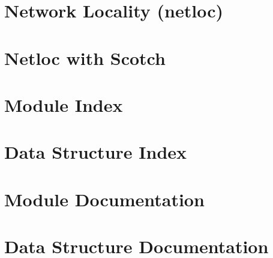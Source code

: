 \documentclass[twoside]{book}
\newcommand{\+}{\discretionary{\mbox{\scriptsize$\hookleftarrow$}}{}{}}
\newcommand{\clearemptydoublepage}{%
  \newpage{\pagestyle{empty}\cleardoublepage}%
}
\begin{document}
\chapter{Network Locality (netloc)}
\label{a00396}

\chapter{Netloc with Scotch}
\label{a00397}

\chapter{Module Index}

\chapter{Data Structure Index}

\chapter{Module Documentation}





















































\chapter{Data Structure Documentation}
































\backmatter
\newpage
{}
\clearemptydoublepage
{}
\printindex
\end{document}
